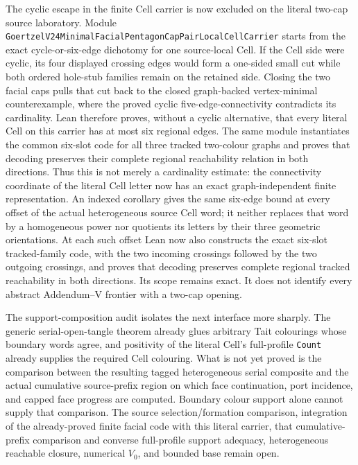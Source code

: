 \documentclass[11pt]{article}
\theoremstyle{definition}
\begin{document}
The cyclic escape in the finite Cell carrier is now excluded on the literal
two-cap source laboratory.  Module
\texttt{GoertzelV24MinimalFacialPentagonCapPairLocalCellCarrier} starts from
the exact cycle-or-six-edge dichotomy for one source-local Cell.  If the Cell
side were cyclic, its four displayed crossing edges would form a one-sided
small cut while both ordered hole-stub families remain on the retained side.
Closing the two facial caps pulls that cut back to the closed graph-backed
vertex-minimal counterexample, where the proved cyclic five-edge-connectivity
contradicts its cardinality.  Lean therefore proves, without a cyclic
alternative, that every literal Cell on this carrier has at most six regional
edges.  The same module instantiates the common six-slot code for all three
tracked two-colour graphs and proves that decoding preserves their complete
regional reachability relation in both directions.  Thus this is not merely a
cardinality estimate: the connectivity coordinate of the literal Cell letter
now has an exact graph-independent finite representation.  An indexed
corollary gives the same six-edge bound at every offset of the actual
heterogeneous source Cell word; it neither replaces that word by a homogeneous
power nor quotients its letters by their three geometric orientations.  At
each such offset Lean now also constructs the exact six-slot tracked-family
code, with the two incoming crossings followed by the two outgoing crossings,
and proves that decoding preserves complete regional tracked reachability in
both directions.  Its scope remains exact.  It does not identify every
abstract Addendum--V frontier with a two-cap opening.

The support-composition audit isolates the next interface more sharply.  The
generic serial-open-tangle theorem already glues arbitrary Tait colourings
whose boundary words agree, and positivity of the literal Cell's full-profile
\texttt{Count} already supplies the required Cell colouring.  What is not yet
proved is the comparison between the resulting tagged heterogeneous serial
composite and the actual cumulative source-prefix region on which face
continuation, port incidence, and capped face progress are computed.  Boundary
colour support alone cannot supply that comparison.  The source
selection/formation comparison, integration of the already-proved finite
facial code with this literal carrier, that cumulative-prefix comparison and
converse full-profile support adequacy, heterogeneous reachable closure,
numerical $V_0$, and bounded base remain open.
\end{document}
